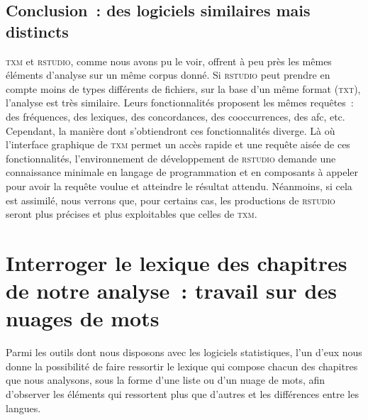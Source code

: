 \subsection*{Conclusion~: des logiciels similaires mais distincts} 
\textsc{txm} et \textsc{rstudio}, comme nous avons pu le voir, offrent à peu près les mêmes éléments d'analyse sur un même corpus donné. Si \textsc{rstudio} peut prendre en compte moins de types différents de fichiers, sur la base d'un même format (\textsc{txt}), l'analyse est très similaire. Leurs fonctionnalités proposent les mêmes requêtes~: des fréquences, des lexiques, des concordances, des cooccurrences, des \acrshort{afc}, etc. Cependant, la manière dont s'obtiendront ces fonctionnalités diverge. Là où l'interface graphique de \textsc{txm} permet un accès rapide et une requête aisée de ces fonctionnalités, l'environnement de développement de \textsc{rstudio} demande une connaissance minimale en langage de programmation et en composants à appeler pour avoir la requête voulue et atteindre le résultat attendu. Néanmoins, si cela est assimilé, nous verrons que, pour certains cas, les productions de \textsc{rstudio} seront plus précises et plus exploitables que celles de \textsc{txm}.

\section{Interroger le lexique des chapitres de notre analyse~: travail sur des nuages de mots }
Parmi les outils dont nous disposons avec les logiciels statistiques, l'un d'eux nous donne la possibilité de faire ressortir le lexique qui compose chacun des chapitres que nous analysons, sous la forme d'une liste ou d'un nuage de mots, afin d'observer les éléments qui ressortent plus que d'autres et les différences entre les langues. 


